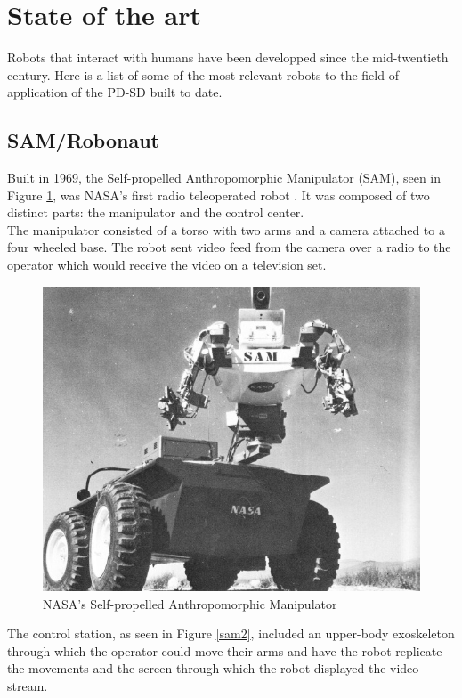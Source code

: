 \section{State of the art}

Robots that interact with humans have been developped since the mid-twentieth century. Here is a list of some of the most relevant robots to the field of application of the PD-SD built to date. 


\subsection{SAM/Robonaut}
Built in 1969, the Self-propelled Anthropomorphic Manipulator (SAM), seen in Figure \ref{sam}, was NASA's first radio teleoperated robot \cite{robonaut1}. It was composed of two distinct parts: the manipulator and the control center.\\

The manipulator consisted of a torso with two arms and a camera attached to a four wheeled base. The robot sent video feed from the camera over a radio to the operator which would receive the video on a television set.\\

	\begin{figure}[H]
			\centering
			\includegraphics[scale=0.5]{images/StateOfArt/SAM.jpg}
			\caption{NASA's Self-propelled Anthropomorphic Manipulator }
			\label{sam}
	\end{figure}
	\bigskip

The control station, as seen in Figure \ref{sam2}, included an upper-body exoskeleton through which the operator could move their arms and have the robot replicate the movements and the screen through which the robot displayed the video stream.\\

